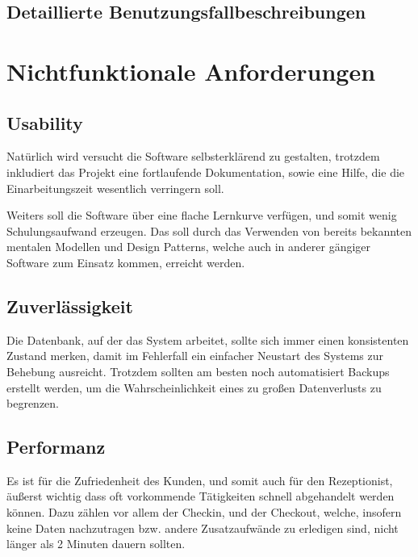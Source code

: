 \documentclass[10pt,a4paper,titlepage]{article}
\begin{document}
\subsection{Detaillierte Benutzungsfallbeschreibungen}














\newpage

\section{Nichtfunktionale Anforderungen}
\subsection{Usability}
Natürlich wird versucht die Software selbsterklärend zu gestalten, trotzdem inkludiert das Projekt eine fortlaufende Dokumentation, sowie eine Hilfe, die die Einarbeitungszeit wesentlich verringern soll.

Weiters soll die Software über eine flache Lernkurve verfügen, und somit wenig Schulungsaufwand erzeugen. Das soll durch das Verwenden von bereits bekannten mentalen Modellen und Design Patterns, welche auch in anderer gängiger Software zum Einsatz kommen, erreicht werden.
\subsection{Zuverlässigkeit}
Die Datenbank, auf der das System arbeitet, sollte sich immer einen konsistenten Zustand merken, damit im Fehlerfall ein einfacher Neustart des Systems zur Behebung ausreicht. Trotzdem sollten am besten noch automatisiert Backups erstellt werden, um die Wahrscheinlichkeit eines zu großen Datenverlusts zu begrenzen.
\subsection{Performanz}
Es ist für die Zufriedenheit des Kunden, und somit auch für den \Gls{Rezeptionist}, äußerst wichtig dass oft vorkommende Tätigkeiten schnell abgehandelt werden können. Dazu zählen vor allem der \Gls{Checkin}, und der \Gls{Checkout}, welche, insofern keine Daten nachzutragen bzw. andere Zusatzaufwände zu erledigen sind, nicht länger als 2 Minuten dauern sollten.
\end{document}

